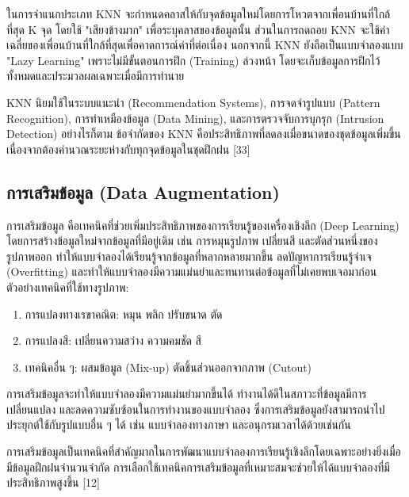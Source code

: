 \documentclass[12pt,oneside,openright,a4paper]{cpe-thai-project}
\begin{document}
\hspace{2em} ในการจำแนกประเภท KNN จะกำหนดคลาสให้กับจุดข้อมูลใหม่โดยการโหวตจากเพื่อนบ้านที่ใกล้ที่สุด K จุด โดยใช้ "เสียงข้างมาก" เพื่อระบุคลาสของข้อมูลนั้น ส่วนในการถดถอย KNN จะใช้ค่าเฉลี่ยของเพื่อนบ้านที่ใกล้ที่สุดเพื่อคาดการณ์ค่าที่ต่อเนื่อง นอกจากนี้ KNN ยังถือเป็นแบบจำลองแบบ "Lazy Learning" เพราะไม่มีขั้นตอนการฝึก (Training) ล่วงหน้า โดยจะเก็บข้อมูลการฝึกไว้ทั้งหมดและประมวลผลเฉพาะเมื่อมีการทำนาย

\hspace{2em} KNN นิยมใช้ในระบบแนะนำ (Recommendation Systems), การจดจำรูปแบบ (Pattern Recognition), การทำเหมืองข้อมูล (Data Mining), และการตรวจจับการบุกรุก (Intrusion Detection) อย่างไรก็ตาม ข้อจำกัดของ KNN คือประสิทธิภาพที่ลดลงเมื่อขนาดของชุดข้อมูลเพิ่มขึ้น เนื่องจากต้องคำนวณระยะห่างกับทุกจุดข้อมูลในชุดฝึกฝน [33]

\subsection{การเสริมข้อมูล (Data Augmentation)}

\hspace{2em}การเสริมข้อมูล คือเทคนิคที่ช่วยเพิ่มประสิทธิภาพของการเรียนรู้ของเครื่องเชิงลึก (Deep Learning) โดยการสร้างข้อมูลใหม่จากข้อมูลที่มีอยู่เดิม เช่น การหมุนรูปภาพ เปลี่ยนสี และตัดส่วนหนึ่งของรูปภาพออก ทำให้แบบจำลองได้เรียนรู้จากข้อมูลที่หลากหลายมากขึ้น ลดปัญหาการเรียนรู้จำเจ (Overfitting) และทำให้แบบจำลองมีความแม่นยำและทนทานต่อข้อมูลที่ไม่เคยพบเจอมาก่อน
ตัวอย่างเทคนิคที่ใช้ทางรูปภาพ:
\begin{enumerate}
\item การแปลงทางเรขาคณิต: หมุน พลิก ปรับขนาด ตัด
\item การแปลงสี: เปลี่ยนความสว่าง ความคมชัด สี
\item เทคนิคอื่น ๆ: ผสมข้อมูล (Mix-up) ตัดชิ้นส่วนออกจากภาพ (Cutout)
\end{enumerate}


\hspace{2em}การเสริมข้อมูลจะทำให้แบบจำลองมีความแม่นยำมากขึ้นได้ ทำงานได้ดีในสภาวะที่ข้อมูลมีการเปลี่ยนแปลง และลดความซับซ้อนในการทำงานของแบบจำลอง ซึ่งการเสริมข้อมูลยังสามารถนำไปประยุกต์ใช้กับรูปแบบอื่น ๆ ได้ เช่น แบบจำลองทางภาษา และอนุกรมเวลาได้ด้วยเช่นกัน 

\hspace{2em}การเสริมข้อมูลเป็นเทคนิคที่สำคัญมากในการพัฒนาแบบจำลองการเรียนรู้เชิงลึกโดยเฉพาะอย่างยิ่งเมื่อมีข้อมูลฝึกฝนจำนวนจำกัด การเลือกใช้เทคนิคการเสริมข้อมูลที่เหมาะสมจะช่วยให้ได้แบบจำลองที่มีประสิทธิภาพสูงขึ้น [12]
\end{document}
